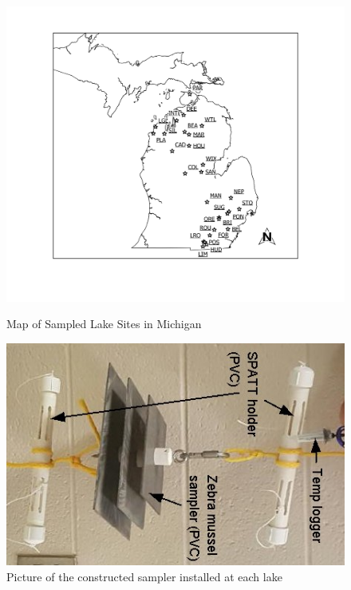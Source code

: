 \begin{figure}[!t]

\includegraphics[width=\textwidth]{figures/Overview}
\label{overview}
\caption{Map of Sampled Lake Sites in Michigan}

\end{figure}

\begin{figure}[!ht]
\includegraphics[width=\textwidth, angle =-90]{figures/samplers}
\caption{Picture of the constructed sampler installed at each lake}
\label{samplerr}
\end{figure}





